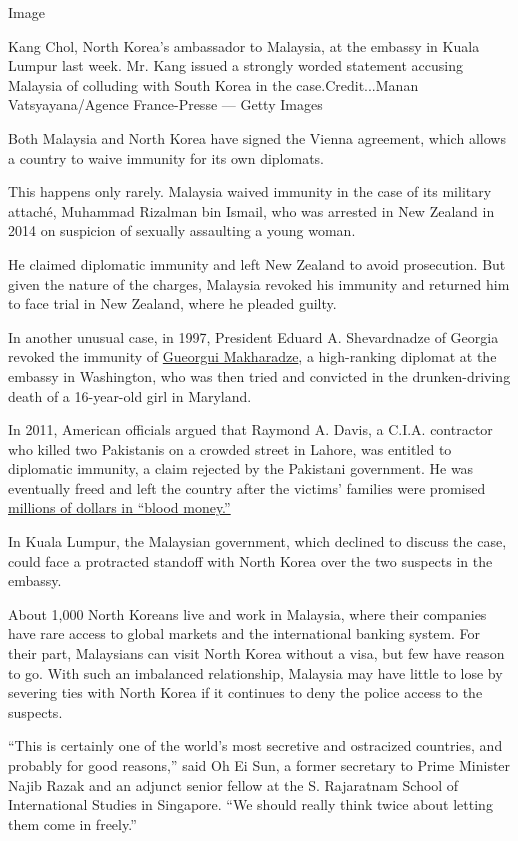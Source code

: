 Image

Kang Chol, North Korea's ambassador to Malaysia, at the embassy in Kuala
Lumpur last week. Mr. Kang issued a strongly worded statement accusing
Malaysia of colluding with South Korea in the case.Credit...Manan
Vatsyayana/Agence France-Presse --- Getty Images

Both Malaysia and North Korea have signed the Vienna agreement, which
allows a country to waive immunity for its own diplomats.

This happens only rarely. Malaysia waived immunity in the case of its
military attaché, Muhammad Rizalman bin Ismail, who was arrested in New
Zealand in 2014 on suspicion of sexually assaulting a young woman.

He claimed diplomatic immunity and left New Zealand to avoid
prosecution. But given the nature of the charges, Malaysia revoked his
immunity and returned him to face trial in New Zealand, where he pleaded
guilty.

In another unusual case, in 1997, President Eduard A. Shevardnadze of
Georgia revoked the immunity of
\href{http://www.nytimes.com/1997/10/09/us/georgian-diplomat-pleads-guilty-in-death-of-teen-age-girl.html}{Gueorgui
Makharadze}, a high-ranking diplomat at the embassy in Washington, who
was then tried and convicted in the drunken-driving death of a
16-year-old girl in Maryland.

In 2011, American officials argued that Raymond A. Davis, a C.I.A.
contractor who killed two Pakistanis on a crowded street in Lahore, was
entitled to diplomatic immunity, a claim rejected by the Pakistani
government. He was eventually freed and left the country after the
victims' families were promised
\href{http://www.nytimes.com/2011/03/17/world/asia/17pakistan.html}{millions
of dollars in ``blood money.''}

In Kuala Lumpur, the Malaysian government, which declined to discuss the
case, could face a protracted standoff with North Korea over the two
suspects in the embassy.

About 1,000 North Koreans live and work in Malaysia, where their
companies have rare access to global markets and the international
banking system. For their part, Malaysians can visit North Korea without
a visa, but few have reason to go. With such an imbalanced relationship,
Malaysia may have little to lose by severing ties with North Korea if it
continues to deny the police access to the suspects.

``This is certainly one of the world's most secretive and ostracized
countries, and probably for good reasons,'' said Oh Ei Sun, a former
secretary to Prime Minister Najib Razak and an adjunct senior fellow at
the S. Rajaratnam School of International Studies in Singapore. ``We
should really think twice about letting them come in freely.''


